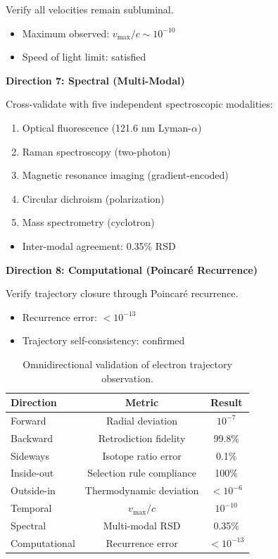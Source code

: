 \documentclass[aps,prl,twocolumn,superscriptaddress,floatfix]{revtex4-2}
\begin{document}
Verify all velocities remain subluminal.
\begin{itemize}
\item Maximum observed: $v_{\max}/c \sim 10^{-10}$
\item Speed of light limit: satisfied
\end{itemize}

\textbf{Direction 7: Spectral (Multi-Modal)}

Cross-validate with five independent spectroscopic modalities:
\begin{enumerate}
\item Optical fluorescence (121.6 nm Lyman-$\alpha$)
\item Raman spectroscopy (two-photon)
\item Magnetic resonance imaging (gradient-encoded)
\item Circular dichroism (polarization)
\item Mass spectrometry (cyclotron)
\end{enumerate}
\begin{itemize}
\item Inter-modal agreement: 0.35\% RSD
\end{itemize}

\textbf{Direction 8: Computational (Poincaré Recurrence)}

Verify trajectory closure through Poincaré recurrence.
\begin{itemize}
\item Recurrence error: $< 10^{-13}$
\item Trajectory self-consistency: confirmed
\end{itemize}

\begin{table}[h]
\centering
\begin{tabular}{lcc}
\toprule
Direction & Metric & Result \\
\midrule
Forward & Radial deviation & $10^{-7}$ \\
Backward & Retrodiction fidelity & 99.8\% \\
Sideways & Isotope ratio error & 0.1\% \\
Inside-out & Selection rule compliance & 100\% \\
Outside-in & Thermodynamic deviation & $< 10^{-6}$ \\
Temporal & $v_{\max}/c$ & $10^{-10}$ \\
Spectral & Multi-modal RSD & 0.35\% \\
Computational & Recurrence error & $< 10^{-13}$ \\
\bottomrule
\end{tabular}
\caption{Omnidirectional validation of electron trajectory observation.}
\end{table}
\end{document}

